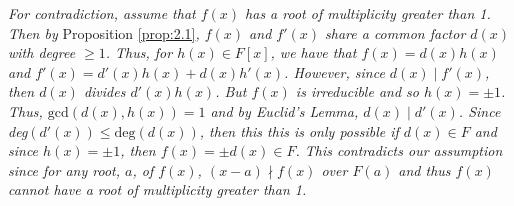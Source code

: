 \documentclass{article}
\makeatletter
\theoremstyle{definition}
\theoremstyle{remark}
\let\oldproofname=\proofname
\renewcommand{\proofname}{\bf{\textit{\oldproofname}}}
\theoremstyle{definition}
\renewenvironment{proof*}[1][\proofname]{\par
  \pushQED{\qed}%
  \normalfont \topsep6\p@\@plus6\p@\relax
  \list{}{\leftmargin=0mm
          \rightmargin=0mm
          \settowidth{\itemindent}{\itshape#1}%
          \labelwidth=\itemindent
          \parsep=0pt \listparindent=0mm%
  }
  \item[\hskip\labelsep
        \itshape
    #1\@addpunct{.}]\ignorespaces
}{%
  \popQED\endlist\@endpefalse
}
\makeatother
\begin{document}
        \begin{proof*}
            \emph{For contradiction, assume that $f(x)$ has a root of multiplicity greater than 1. Then by} Proposition \ref{prop:2.1}\emph{, $f(x)$ and $f'(x)$ share a common factor $d(x)$ with degree $\geq 1$. Thus, for $h(x)\in F[x]$, we have that $f(x)=d(x)h(x)$ and $f'(x)=d'(x)h(x)+d(x)h'(x)$. However, since $d(x)\mid f'(x)$, then $d(x)$ divides $d'(x)h(x)$. But $f(x)$ is irreducible and so $h(x)=\pm 1$. Thus, $\text{gcd}(d(x),h(x))=1$ and by Euclid's Lemma, $d(x)\mid d'(x)$. Since deg$(d'(x))\leq\text{deg}(d(x))$, then this this is only possible if $d(x)\in F$ and since $h(x)=\pm 1$, then $f(x)=\pm d(x)\in F$. This contradicts our assumption since for any root, $a$, of $f(x)$, $(x-a)\nmid f(x)$ over $F(a)$ and thus $f(x)$ cannot have a root of multiplicity greater than 1.
            }
        \end{proof*}
\end{document}
